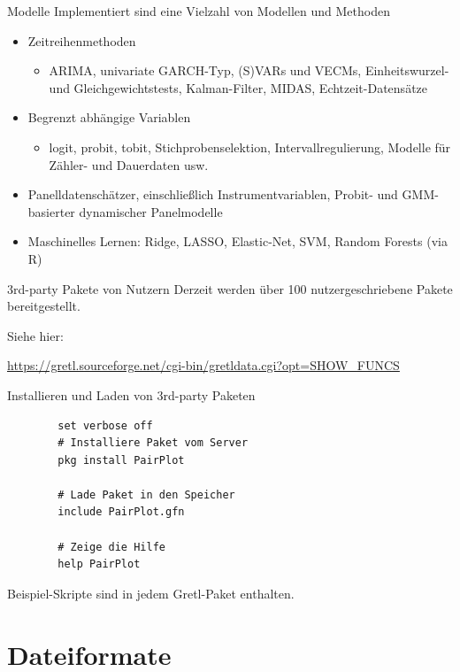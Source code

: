 \documentclass{beamer}[11pt]
\begin{document}
\begin{frame}{Modelle}
	Implementiert sind eine Vielzahl von Modellen und Methoden
	\begin{itemize}
		\item Zeitreihenmethoden
		      \begin{itemize}
			      \item ARIMA, univariate GARCH-Typ, (S)VARs und VECMs, Einheitswurzel- und Gleichgewichtstests, Kalman-Filter, MIDAS, Echtzeit-Datensätze
		      \end{itemize}
		\item Begrenzt abhängige Variablen
		      \begin{itemize}
			      \item logit, probit, tobit, Stichprobenselektion, Intervallregulierung, Modelle für Zähler- und Dauerdaten usw.
		      \end{itemize}
		\item Panelldatenschätzer, einschließlich Instrumentvariablen, Probit- und GMM-basierter dynamischer Panelmodelle
		\item Maschinelles Lernen: Ridge, LASSO, Elastic-Net, SVM, Random Forests (via R)
	\end{itemize}
\end{frame}


\begin{frame}{3rd-party Pakete von Nutzern}
	Derzeit werden über 100 nutzergeschriebene Pakete bereitgestellt.
	\medskip

	Siehe hier:
	\medskip

	\url{https://gretl.sourceforge.net/cgi-bin/gretldata.cgi?opt=SHOW_FUNCS}
\end{frame}


\begin{frame}[fragile]{Installieren und Laden von 3rd-party Paketen}
	\begin{verbatim}
		set verbose off
		# Installiere Paket vom Server
		pkg install PairPlot

		# Lade Paket in den Speicher
		include PairPlot.gfn

		# Zeige die Hilfe
		help PairPlot
	\end{verbatim}

	Beispiel-Skripte sind in jedem Gretl-Paket enthalten.
\end{frame}


\section{Dateiformate}
\end{document}
